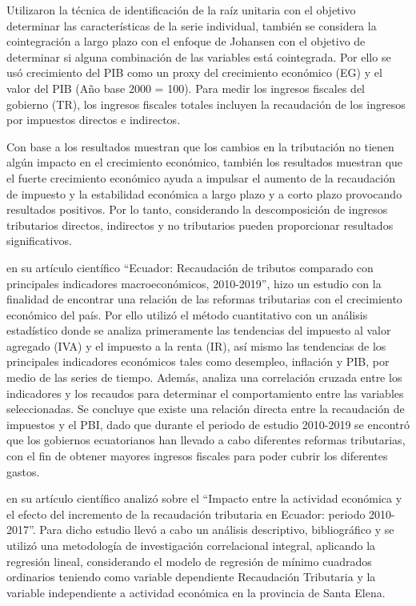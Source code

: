 \documentclass[
  letterpaper,
  DIV=11,
  numbers=noendperiod]{scrartcl}
\begin{document}
Utilizaron la técnica de identificación de la raíz unitaria con el
objetivo determinar las características de la serie individual, también
se considera la cointegración a largo plazo con el enfoque de Johansen
con el objetivo de determinar si alguna combinación de las variables
está cointegrada. Por ello se usó crecimiento del PIB como un proxy del
crecimiento económico (EG) y el valor del PIB (Año base 2000 = 100).
Para medir los ingresos fiscales del gobierno (TR), los ingresos
fiscales totales incluyen la recaudación de los ingresos por impuestos
directos e indirectos.

Con base a los resultados muestran que los cambios en la tributación no
tienen algún impacto en el crecimiento económico, también los resultados
muestran que el fuerte crecimiento económico ayuda a impulsar el aumento
de la recaudación de impuesto y la estabilidad económica a largo plazo y
a corto plazo provocando resultados positivos. Por lo tanto,
considerando la descomposición de ingresos tributarios directos,
indirectos y no tributarios pueden proporcionar resultados
significativos.

\textcite{velepucha_ecuador_2021} en su artículo científico ``Ecuador:
Recaudación de tributos comparado con principales indicadores
macroeconómicos, 2010-2019'', hizo un estudio con la finalidad de
encontrar una relación de las reformas tributarias con el crecimiento
económico del país. Por ello utilizó el método cuantitativo con un
análisis estadístico donde se analiza primeramente las tendencias del
impuesto al valor agregado (IVA) y el impuesto a la renta (IR), así
mismo las tendencias de los principales indicadores económicos tales
como desempleo, inflación y PIB, por medio de las series de tiempo.
Además, analiza una correlación cruzada entre los indicadores y los
recaudos para determinar el comportamiento entre las variables
seleccionadas. Se concluye que existe una relación directa entre la
recaudación de impuestos y el PBI, dado que durante el periodo de
estudio 2010-2019 se encontró que los gobiernos ecuatorianos han llevado
a cabo diferentes reformas tributarias, con el fin de obtener mayores
ingresos fiscales para poder cubrir los diferentes gastos.

\textcite{narvaez_cumbicos_impacto_2019} en su artículo científico
analizó sobre el ``Impacto entre la actividad económica y el efecto del
incremento de la recaudación tributaria en Ecuador: periodo 2010-2017''.
Para dicho estudio llevó a cabo un análisis descriptivo, bibliográfico y
se utilizó una metodología de investigación correlacional integral,
aplicando la regresión lineal, considerando el modelo de regresión de
mínimo cuadrados ordinarios teniendo como variable dependiente
Recaudación Tributaria y la variable independiente a actividad económica
en la provincia de Santa Elena.
\end{document}
